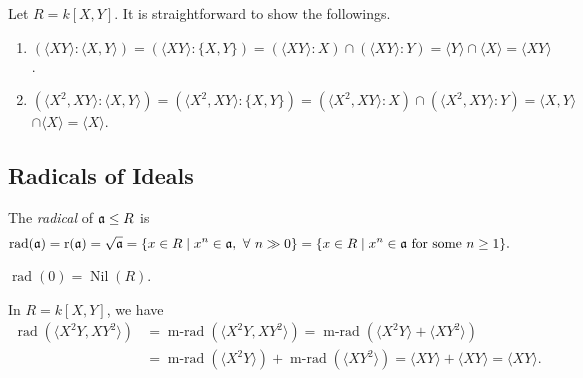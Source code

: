 \begin{example}
    Let $R = k[X,Y]$. It is straightforward to show the followings.
    \begin{enumerate}
        \item $(\langle XY \rangle: \langle X,Y \rangle) = (\langle XY \rangle: \{X,Y\}) = (\langle XY \rangle: X) \cap (\langle XY \rangle : Y) = \langle Y \rangle \cap \langle X \rangle = \langle XY \rangle$.
        \item $(\langle X^2,XY \rangle: \langle X,Y \rangle) = (\langle X^2,XY \rangle: \{X,Y\}) = (\langle X^2,XY \rangle:X) \cap (\langle X^2,XY \rangle: Y) = \langle X,Y \rangle$ \\
            $\cap \langle X \rangle = \langle X \rangle$.
    \end{enumerate}
\end{example}

\subsection*{Radicals of Ideals}

\begin{definition}
    The \emph{radical} of $\mathfrak{a} \leq R$ is 
    \[\operatorname{rad}(\mathfrak{a}) = \operatorname{r}(\mathfrak{a}) = \sqrt {\mathfrak{a}} = \{x \in R \mid x^n \in \mathfrak{a}, \ \forall \  n \gg 0\} = \{x \in R \mid x^n \in \mathfrak{a} \text{ for some }n \geq 1\}.\] 
\end{definition}

\begin{remark}
    $\operatorname{rad}(0) = \operatorname{Nil}(R)$.
\end{remark}

\begin{example}
    In $R = k[X,Y]$, we have
    \begin{align*}
        \operatorname{rad}(\langle X^2Y,XY^2 \rangle) &= \operatorname{m-rad}(\langle X^2Y,XY^2 \rangle) = \operatorname{m-rad}(\langle X^2Y \rangle + \langle XY^2 \rangle) \\
                                                      &= \operatorname{m-rad}(\langle X^2Y \rangle) + \operatorname{m-rad}(\langle XY^2 \rangle) = \langle XY \rangle + \langle XY \rangle = \langle XY \rangle.
    \end{align*}
\end{example}

